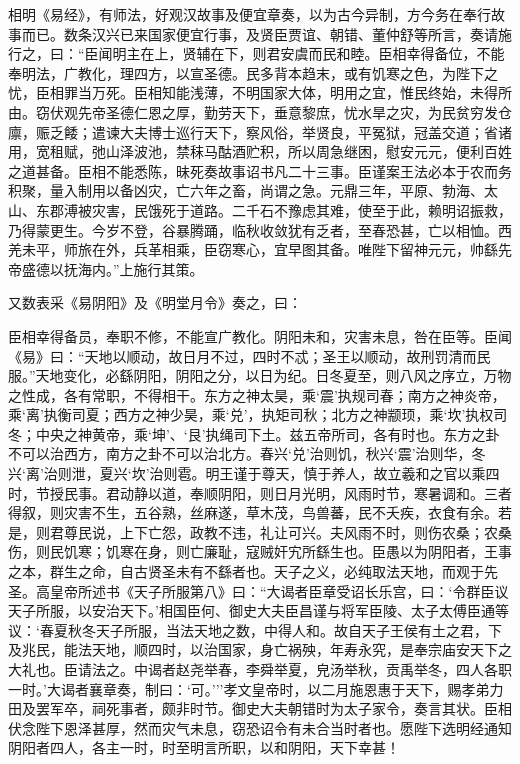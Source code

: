 \documentclass[]{article}
\begin{document}
相明《易经》，有师法，好观汉故事及便宜章奏，以为古今异制，方今务在奉行故事而已。数条汉兴已来国家便宜行事，及贤臣贾谊、朝错、董仲舒等所言，奏请施行之，曰：``臣闻明主在上，贤辅在下，则君安虞而民和睦。臣相幸得备位，不能奉明法，广教化，理四方，以宣圣德。民多背本趋末，或有饥寒之色，为陛下之忧，臣相罪当万死。臣相知能浅薄，不明国家大体，明用之宜，惟民终始，未得所由。窃伏观先帝圣德仁恩之厚，勤劳天下，垂意黎庶，忧水旱之灾，为民贫穷发仓廪，赈乏餧；遣谏大夫博士巡行天下，察风俗，举贤良，平冤狱，冠盖交道；省诸用，宽租赋，弛山泽波池，禁秣马酤酒贮积，所以周急继困，慰安元元，便利百姓之道甚备。臣相不能悉陈，昧死奏故事诏书凡二十三事。臣谨案王法必本于农而务积聚，量入制用以备凶灾，亡六年之畜，尚谓之急。元鼎三年，平原、勃海、太山、东郡溥被灾害，民饿死于道路。二千石不豫虑其难，使至于此，赖明诏振救，乃得蒙更生。今岁不登，谷暴腾踊，临秋收敛犹有乏者，至春恐甚，亡以相恤。西羌未平，师旅在外，兵革相乘，臣窃寒心，宜早图其备。唯陛下留神元元，帅繇先帝盛德以抚海内。''上施行其策。

又数表采《易阴阳》及《明堂月令》奏之，曰：

臣相幸得备员，奉职不修，不能宣广教化。阴阳未和，灾害未息，咎在臣等。臣闻《易》曰：``天地以顺动，故日月不过，四时不忒；圣王以顺动，故刑罚清而民服。''天地变化，必繇阴阳，阴阳之分，以日为纪。日冬夏至，则八风之序立，万物之性成，各有常职，不得相干。东方之神太昊，乘`震'执规司春；南方之神炎帝，乘`离'执衡司夏；西方之神少昊，乘`兑'，执矩司秋；北方之神颛顼，乘`坎'执权司冬；中央之神黄帝，乘`坤'、`艮'执绳司下土。兹五帝所司，各有时也。东方之卦不可以治西方，南方之卦不可以治北方。春兴`兑'治则饥，秋兴`震'治则华，冬兴`离'治则泄，夏兴`坎'治则雹。明王谨于尊天，慎于养人，故立羲和之官以乘四时，节授民事。君动静以道，奉顺阴阳，则日月光明，风雨时节，寒暑调和。三者得叙，则灾害不生，五谷熟，丝麻遂，草木茂，鸟兽蕃，民不夭疾，衣食有余。若是，则君尊民说，上下亡怨，政教不违，礼让可兴。夫风雨不时，则伤农桑；农桑伤，则民饥寒；饥寒在身，则亡廉耻，寇贼奸宄所繇生也。臣愚以为阴阳者，王事之本，群生之命，自古贤圣未有不繇者也。天子之义，必纯取法天地，而观于先圣。高皇帝所述书《天子所服第八》曰：``大谒者臣章受诏长乐宫，曰：`令群臣议天子所服，以安治天下。'相国臣何、御史大夫臣昌谨与将军臣陵、太子太傅臣通等议：`春夏秋冬天子所服，当法天地之数，中得人和。故自天子王侯有土之君，下及兆民，能法天地，顺四时，以治国家，身亡祸殃，年寿永究，是奉宗庙安天下之大礼也。臣请法之。中谒者赵尧举春，李舜举夏，皃汤举秋，贡禹举冬，四人各职一时。'大谒者襄章奏，制曰：`可。'''孝文皇帝时，以二月施恩惠于天下，赐孝弟力田及罢军卒，祠死事者，颇非时节。御史大夫朝错时为太子家令，奏言其状。臣相伏念陛下恩泽甚厚，然而灾气未息，窃恐诏令有未合当时者也。愿陛下选明经通知阴阳者四人，各主一时，时至明言所职，以和阴阳，天下幸甚！
\end{document}
